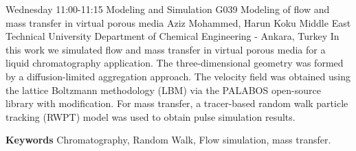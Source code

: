 
    \begin{abstract_basarim}
    {Wednesday 11:00-11:15}
    {Modeling and Simulation}
    {G039}
    {Modeling of flow and mass transfer in virtual porous media}
    {%
    Aziz Mohammed, Harun Koku}
    {%
    }
    {%
    Middle East Technical University Department of Chemical Engineering - Ankara, Turkey}
    In this work we simulated flow and mass transfer in virtual porous media for a liquid chromatography application. The three-dimensional geometry was formed by a diffusion-limited aggregation approach. The velocity field was obtained using the lattice Boltzmann methodology (LBM) via the PALABOS open-source library with modification. For mass transfer, a tracer-based random walk particle tracking (RWPT) model was used to obtain pulse simulation results. 
    
        \textbf{Keywords} \newline{}Chromatography, Random Walk, Flow simulation, mass transfer.
    \end{abstract_basarim}
    